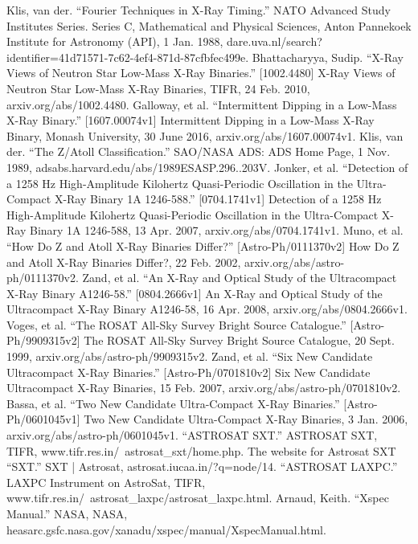 \documentclass[a4paper,twoside]{report}
\numberwithin{equation}{section}
\begin{document}
\begin{thebibliography}{20}

Klis, van der. “Fourier Techniques in X-Ray Timing.” NATO Advanced Study Institutes Series. Series C, Mathematical and Physical Sciences, Anton Pannekoek Institute for Astronomy (API), 1 Jan. 1988, dare.uva.nl/search?identifier=41d71571-7c62-4ef4-871d-87cfbfec499e.
Bhattacharyya, Sudip. “X-Ray Views of Neutron Star Low-Mass X-Ray Binaries.” [1002.4480] X-Ray Views of Neutron Star Low-Mass X-Ray Binaries, TIFR, 24 Feb. 2010, arxiv.org/abs/1002.4480.
Galloway, et al. “Intermittent Dipping in a Low-Mass X-Ray Binary.” [1607.00074v1] Intermittent Dipping in a Low-Mass X-Ray Binary, Monash University, 30 June 2016, arxiv.org/abs/1607.00074v1.
Klis, van der. “The Z/Atoll Classification.” SAO/NASA ADS: ADS Home Page, 1 Nov. 1989, adsabs.harvard.edu/abs/1989ESASP.296..203V.
Jonker, et al. “Detection of a 1258 Hz High-Amplitude Kilohertz Quasi-Periodic Oscillation in the Ultra-Compact X-Ray Binary 1A 1246-588.” [0704.1741v1] Detection of a 1258 Hz High-Amplitude Kilohertz Quasi-Periodic Oscillation in the Ultra-Compact X-Ray Binary 1A 1246-588, 13 Apr. 2007, arxiv.org/abs/0704.1741v1.
Muno, et al. “How Do Z and Atoll X-Ray Binaries Differ?” [Astro-Ph/0111370v2] How Do Z and Atoll X-Ray Binaries Differ?, 22 Feb. 2002, arxiv.org/abs/astro-ph/0111370v2.
Zand, et al. “An X-Ray and Optical Study of the Ultracompact X-Ray Binary A1246-58.” [0804.2666v1] An X-Ray and Optical Study of the Ultracompact X-Ray Binary A1246-58, 16 Apr. 2008, arxiv.org/abs/0804.2666v1.
Voges, et al. “The ROSAT All-Sky Survey Bright Source Catalogue.” [Astro-Ph/9909315v2] The ROSAT All-Sky Survey Bright Source Catalogue, 20 Sept. 1999, arxiv.org/abs/astro-ph/9909315v2.
Zand, et al. “Six New Candidate Ultracompact X-Ray Binaries.” [Astro-Ph/0701810v2] Six New Candidate Ultracompact X-Ray Binaries, 15 Feb. 2007, arxiv.org/abs/astro-ph/0701810v2.
Bassa, et al. “Two New Candidate Ultra-Compact X-Ray Binaries.” [Astro-Ph/0601045v1] Two New Candidate Ultra-Compact X-Ray Binaries, 3 Jan. 2006, arxiv.org/abs/astro-ph/0601045v1.
“ASTROSAT SXT.” ASTROSAT SXT, TIFR, www.tifr.res.in/~astrosat\_sxt/home.php. The website for Astrosat SXT
“SXT.” SXT | Astrosat, astrosat.iucaa.in/?q=node/14.
“ASTROSAT LAXPC.” LAXPC Instrument on AstroSat, TIFR, www.tifr.res.in/~astrosat\_laxpc/astrosat\_laxpc.html.
Arnaud, Keith. “Xspec Manual.” NASA, NASA, heasarc.gsfc.nasa.gov/xanadu/xspec/manual/XspecManual.html.

\end{thebibliography}
\end{document}
